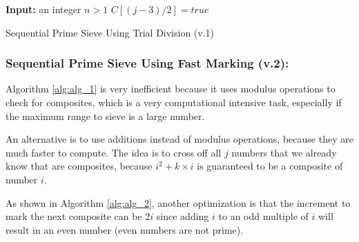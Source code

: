 \documentclass[runningheads,a4paper]{llncs}
\begin{document}
\begin{algorithm}[h]
        \begin{algorithmic}[1]
                \State \textbf{Input:} an integer $n > 1$
                \Statex
                                                \State $C[(j - 3) / 2] = true$
                                        \EndIf
                                \EndFor
                        \EndIf
                \EndFor
                \Statex
        \end{algorithmic}
        \caption{Sequential Prime Sieve Using Trial Division (v.1)}
        \label{alg:alg_1}
\end{algorithm}


\subsubsection{Sequential Prime Sieve Using Fast Marking (v.2):}
\label{Sequential Prime Sieve Using Fast Marking}

Algorithm \ref{alg:alg_1} is very inefficient because it uses modulus operations to check for composites, which is a very computational intensive task, especially if the maximum range to sieve is a large number.

An alternative is to use additions instead of modulus operations, because they are much faster to compute. The  idea is to cross off all $j$ numbers that we already know that are composites, because $i^2 + k \times i$ is guaranteed to be a composite of number $i$.

As shown in Algorithm \ref{alg:alg_2}, another optimization is that the increment to mark the next composite can be $2i$ since adding $i$ to an odd multiple of $i$ will result in an even number (even numbers are not prime).
\end{document}
